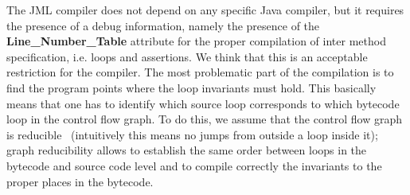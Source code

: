 The JML compiler does not depend on any specific Java compiler, but it requires the presence of a debug information, namely the presence of the \textbf{Line\_Number\_Table} attribute for the proper compilation of inter method specification, i.e. loops and assertions. We think that this is an acceptable restriction for the compiler. The most problematic part of the compilation is to find the program points where the loop invariants must hold. This basically means that one has to identify which source loop corresponds to which bytecode loop in the control flow graph. To do this, we assume that the control flow graph is reducible~\cite{ARUCom1986} (intuitively this means no jumps from outside a loop inside it); graph reducibility allows to establish the same order between loops in the bytecode and source code level and to compile correctly the invariants to the proper places in the bytecode.


